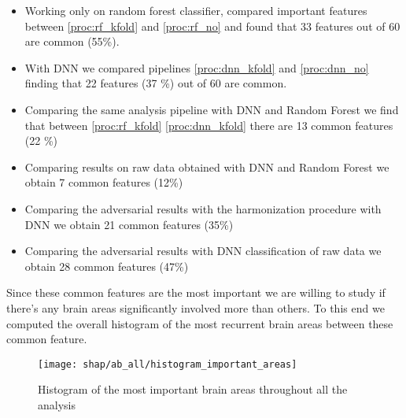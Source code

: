 \documentclass[12pt]{report}
\begin{document}
\begin{itemize}
\item Working only on random forest classifier, compared important features between \ref{proc:rf_kfold} and \ref{proc:rf_no} and found that 33 features out of 60 are common (55\%).
\item With DNN we compared pipelines \ref{proc:dnn_kfold} and \ref{proc:dnn_no} finding that 22 features (37 \%) out of 60 are common.
\item Comparing the same analysis pipeline with DNN and Random Forest we find that between \ref{proc:rf_kfold} \ref{proc:dnn_kfold} there are 13 common features (22 \%)
\item Comparing results on raw data obtained with DNN and Random Forest we obtain 7 common features  (12\%)
\item Comparing the adversarial results with the harmonization procedure with DNN we obtain 21 common features (35\%)
\item Comparing the adversarial results with DNN classification of raw data we obtain 28 common features (47\%)
\end{itemize}

Since these common features are the most important we are willing to study if there's any brain areas significantly involved more than others. To this end we computed the overall histogram of the most recurrent brain areas between these common feature.





\begin{figure}
\centering
  \texttt{[image: shap/ab\_all/histogram\_important\_areas]}
\caption{Histogram of the most important brain areas throughout all the analysis }
\label{fig:histogram_important_areas}
\end{figure}










\newpage


\appendix
\end{document}

